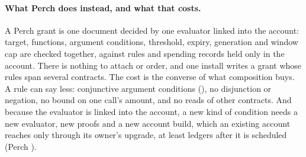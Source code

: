 \paragraph{What Perch does instead, and what that costs.} A Perch grant is one
document decided by one evaluator linked into the account: target, functions,
argument conditions, threshold, expiry, generation and window cap are checked
together, against rules and spending records held only in the account. There is
nothing to attach or order, and one install writes a grant whose rules span
several contracts. The cost is the converse of what composition buys. A rule can
say less:  conjunctive argument conditions
(), no disjunction or negation, no bound on one call's
amount, and no reads of other contracts. And because the evaluator is linked into
the account, a new kind of condition needs a new evaluator, new proofs and a new
account build, which an existing account reaches only through its owner's
upgrade, at least  ledgers after it is scheduled
(Perch ).
